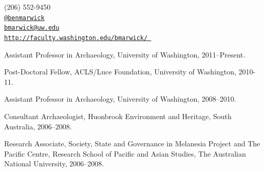 \documentclass[11pt,article,oneside]{memoir}
\makeatletter
\def\myemail{bmarwick@uw.edu}
\def\myweb{http://faculty.washington.edu/bmarwick/ }
\def\myphone{(206) 552-9450}
\def\mytwitter{@benmarwick}
\makeatother
\begin{document}
\begin{minipage}[t]{2.95in}
  
\end{minipage}
\hfill     
\hfill
\begin{minipage}[t]{1.7in}
  \flushright \footnotesize  \addressblock \myphone \, \faPhone \\ 
  {\scriptsize  \texttt{\href{http://twitter.com/benmarwick}{\mytwitter}} \, \faTwitter }  \\ 
  {\scriptsize  \texttt{\href{mailto:\myemail}{\myemail}} \, \faEnvelope} \\
  {\scriptsize  \texttt{\href{\myweb}{\myweb}} \, \faGlobe}
\end{minipage}

\medskip

\reversemarginpar

\bigskip       



\ind Assistant Professor in Archaeology,  University of Washington, 2011--Present.   

\ind Post-Doctoral Fellow, ACLS/Luce Foundation,  University of Washington, 2010-11.      

\ind Assistant Professor in Archaeology,  University of Washington, 2008--2010.    

\ind Consultant Archaeologist, Huonbrook Environment and Heritage, South Australia, 2006--2008.

\ind Research Associate, Society, State and Governance in Melanesia Project and The Pacific Centre, Research School of Pacific and Asian Studies, The Australian National University, 2006--2008.

\bigskip
\end{document}
